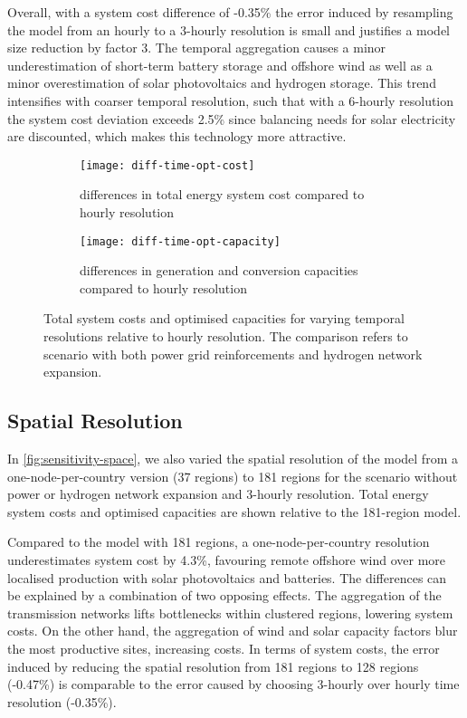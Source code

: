 Overall, with a system cost difference of -0.35\% the error induced by
resampling the model from an hourly to a 3-hourly resolution is small and
justifies a model size reduction by factor 3. The temporal aggregation causes a
minor underestimation of short-term battery storage and offshore wind as well as
a minor overestimation of solar photovoltaics and hydrogen storage. This trend
intensifies with coarser temporal resolution, such that with a 6-hourly
resolution the system cost deviation exceeds 2.5\% since balancing needs for
solar electricity are discounted, which makes this technology more attractive.

\begin{figure}
    \centering
    \begin{subfigure}[t]{\textwidth}
        \centering
        \caption{differences in total energy system cost compared to hourly resolution}
        \texttt{[image: diff-time-opt-cost]}
        \label{fig:sensitivity-time-cost}
    \end{subfigure}
    \begin{subfigure}[t]{\textwidth}
        \centering
        \caption{differences in generation and conversion capacities compared to hourly resolution}
        \texttt{[image: diff-time-opt-capacity]}
        \label{fig:sensitivity-time-cap}
    \end{subfigure}
    \caption{ Total system costs and optimised capacities for varying temporal
    resolutions relative to hourly resolution. The comparison refers to scenario
    with both power grid reinforcements and hydrogen network expansion. }
    \label{fig:sensitivity-time}
\end{figure}

\subsection{Spatial Resolution}
\label{sec:si:sensitivity-space}

In \cref{fig:sensitivity-space}, we also varied the spatial resolution of the
model from a one-node-per-country version (37 regions) to 181 regions for the
scenario without power or hydrogen network expansion and 3-hourly resolution.
Total energy system costs and optimised capacities are shown relative to the
181-region model.

Compared to the model with 181 regions, a one-node-per-country resolution
underestimates system cost by 4.3\%, favouring remote offshore wind over more
localised production with solar photovoltaics and batteries. The differences can
be explained by a combination of two opposing
effects. The aggregation of the transmission
networks lifts bottlenecks within clustered regions, lowering system costs. On
the other hand, the aggregation of wind and solar capacity factors blur the most
productive sites, increasing costs. In terms of system costs, the error induced
by reducing the spatial resolution from 181 regions to 128 regions (-0.47\%) is
comparable to the error caused by choosing 3-hourly over hourly time resolution
(-0.35\%).

